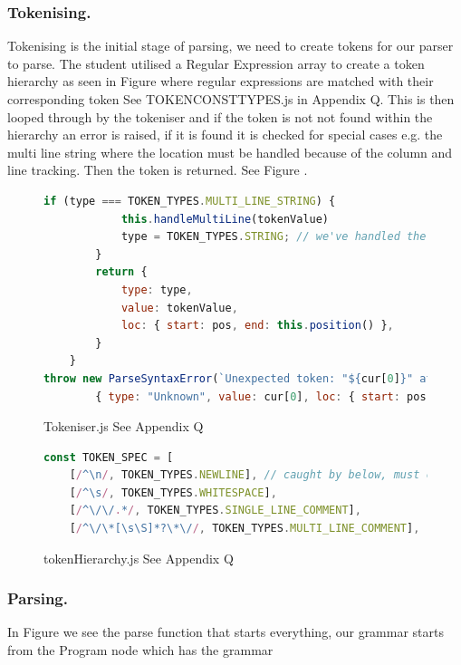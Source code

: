 \subsubsection{Tokenising.}
Tokenising is the initial stage of parsing, we need to create tokens for our parser to parse. 
The student utilised a Regular Expression \cite{regexp} array to create a token hierarchy as seen in Figure  where regular expressions are 
matched with their corresponding token See TOKEN\textunderscore{}CONST\textunderscore{}TYPES.js in Appendix Q. This is then looped through by the tokeniser and if the token is not 
not found within the hierarchy an error is raised, if it is found it is checked for special cases e.g. the multi line string where the location must 
be handled because of the column and line tracking. Then the token is returned. See Figure .
\begin{figure}[h]
    \begin{lstlisting}[language=Javascript]
        if (type === TOKEN_TYPES.MULTI_LINE_STRING) {
            this.handleMultiLine(tokenValue)
            type = TOKEN_TYPES.STRING; // we've handled the multilines so just treat as a string
        }
        return {
            type: type,
            value: tokenValue,
            loc: { start: pos, end: this.position() },
        }
    }
throw new ParseSyntaxError(`Unexpected token: "${cur[0]}" at ${pos.line}:${pos.column}`, 
        { type: "Unknown", value: cur[0], loc: { start: pos, end: pos } })
    \end{lstlisting}
    \caption{Tokeniser.js  See Appendix Q}
    \label{fig:tokeniser}
\end{figure}
\begin{figure}[h]
    \begin{lstlisting}[language=Javascript]
const TOKEN_SPEC = [
    [/^\n/, TOKEN_TYPES.NEWLINE], // caught by below, must come before
    [/^\s/, TOKEN_TYPES.WHITESPACE],
    [/^\/\/.*/, TOKEN_TYPES.SINGLE_LINE_COMMENT],
    [/^\/\*[\s\S]*?\*\//, TOKEN_TYPES.MULTI_LINE_COMMENT],
    \end{lstlisting}
    \caption{tokenHierarchy.js  See Appendix Q}
    \label{fig:tokenHierarchy}
\end{figure}
\subsubsection{Parsing.}
In Figure  we see the parse function that starts everything, our grammar starts from the Program node which has the grammar 

